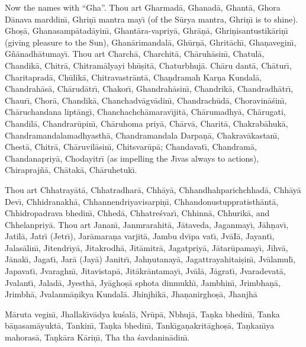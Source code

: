 Now the names with ``Gha''. Thou art Gharmad\=a, Ghanad\=a, Ghant\=a, Ghora D\=anava marddin\={\i}, Ghri\d{n}\={\i} mantra may\={\i} (of the S\=urya mantra, Ghri\d{n}\={\i} is to shine). Gho\d{s}\=a, Ghanasamp\=atad\=ayin\={\i}, Ghant\=ara-vapriy\=a, Ghr\=a\d{n}\=a, Ghri\d{n}isantustik\=ari\d{n}\={\i} (giving pleasure to the Sun), Ghan\=arimandal\=a, Gh\=ur\d{n}\=a, Ghrit\=ach\={\i}, Gha\d{n}avegin\={\i}, G\~n\=anadh\=atumay\={\i}. Thou art Charch\=a, Charchit\=a, Ch\=aruh\=asin\={\i}, Chatul\=a, Chandik\=a, Chitr\=a, Chitram\=alyayi bh\=u\d{s}it\=a, Chaturbhuj\=a. Ch\=aru dant\=a, Ch\=atur\={\i}, Charitaprad\=a, Ch\=ulik\=a, Chitravastr\=ant\=a, Cha\d{n}dramah Kar\d{n}a Kundal\=a, Chandrah\=as\=a, Ch\=arud\=atr\={\i}, Chakor\={\i}, Ghandrah\=asin\={\i}, Chandrik\=a, Chandradh\=atr\={\i}, Chaur\={\i}, Chor\=a, Chandik\=a, Chanchadv\=agv\=adin\={\i}, Chandrach\=ud\=a, Choravin\=a\'sin\={\i}, Ch\=aruchandana lipt\=ang\={\i}, Chanchachch\=amarav\={\i}jit\=a, Ch\=arumadhy\=a, Ch\=arugati, Chandil\=a, Chandrar\=upin\={\i}, Ch\=aruhoma priy\=a, Ch\=arv\=a, Charit\=a, Chakrab\=ahuk\=a, Chandramandalamadhyasth\=a, Chandramandala Darpa\d{n}\=a, Chakrav\=akastan\={\i}, Chest\=a, Chitr\=a, Ch\=aruvil\=asin\={\i}, Chitsvar\=up\=a; Chandavat\={\i}, Chandram\=a, Chandanapriy\=a, Chodayitr\={\i} (as impelling the J\={\i}vas always to actions), Chirapraj\~n\=a, Ch\=atak\=a, Ch\=aruhetuk\={\i}.

Thou art Chhatray\=at\=a, Chhatradhar\=a, Chh\=ay\=a, Chhandhahparichchhad\=a, Chh\=ay\=a Dev\={\i}, Chhidranakh\=a, Chhannendriyavisarpi\d{n}\={\i}, Chhandonustuppratisth\=ant\=a, Chhidropadrava bhedin\={\i}, Chhed\=a, Chhatre\'svar\={\i}, Chhinn\=a, Chhurik\=a, and Chhelanpriy\=a. Thou art Janan\={\i}, Janmrarahit\=a, J\=ataveda, Jaganmay\={\i}, J\=ah\d{n}av\={\i}, Jatil\=a, Jatr\={\i} (Jetr\={\i}), Jar\=amara\d{n}a varjit\=a, Jambu dv\={\i}pa vat\={\i}, Jv\=aI\=a, Jayant\={\i}, Jalas\=alin\={\i}, Jitendr\={\i}y\=a, Jitakrodh\=a, Jit\=amitr\=a, Jagatpriy\=a, J\=atar\=upamay\={\i}, Jihv\=a, J\=anak\={\i}, Jagat\={\i}, Jar\=a (Jay\=a) Janitr\={\i}, Jah\d{n}utanay\=a, Jagattrayahitai\d{s}in\={\i}, Jv\=alamul\={\i}, Japavat\={\i}, Jvaraghn\={\i}, Jitavistap\=a, Jit\=akr\=antamay\={\i}, Jv\=al\=a, J\=agrat\={\i}, Jvaradevat\=a, Jvalant\={\i}, Jalad\=a, Jyesth\=a, Jy\=agho\d{s}\=a sphota dinmukh\={\i}, Jambhin\={\i}, Jrimbha\d{n}\=a, Jrimbh\=a, Jvalanm\=a\d{n}ikya Kundal\=a. Jhinjhik\=a, Jha\d{n}anirgho\d{s}\=a, Jhanjh\=a

M\=aruta vegin\={\i}, Jhallak\={\i}v\=adya ku\'sal\=a, Nr\=up\=a, Nbhuj\=a, Ta\d{n}ka bhedin\={\i}, Tanka b\=a\d{n}asam\=ayukt\=a, Tankin\={\i}, Ta\d{n}ka bhedin\={\i}, Tank\={\i}ga\d{n}akrit\=agho\d{s}\=a, Ta\d{n}kan\={\i}ya mahoras\=a, Ta\d{n}k\=ara K\=ari\d{n}\={\i}, Tha tha \'savdanin\=adin\={\i}.

